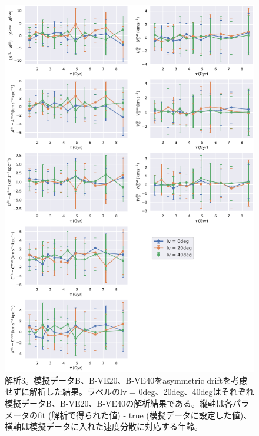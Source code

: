 \begin{figure}[htbp]
	\centering
	\includegraphics[width=15cm]{fig/Mock_VE.pdf}
	\caption{解析3。模擬データB、B-VE20、B-VE40をasymmetric driftを考慮せずに解析した結果。ラベルのlv = 0deg、20deg、40degはそれぞれ模擬データB、B-VE20、B-VE40の解析結果である。縦軸は各パラメータのfit (解析で得られた値) - true (模擬データに設定した値)、横軸は模擬データに入れた速度分散に対応する年齢。} \label{fig:Mock_VE}
\end{figure}



